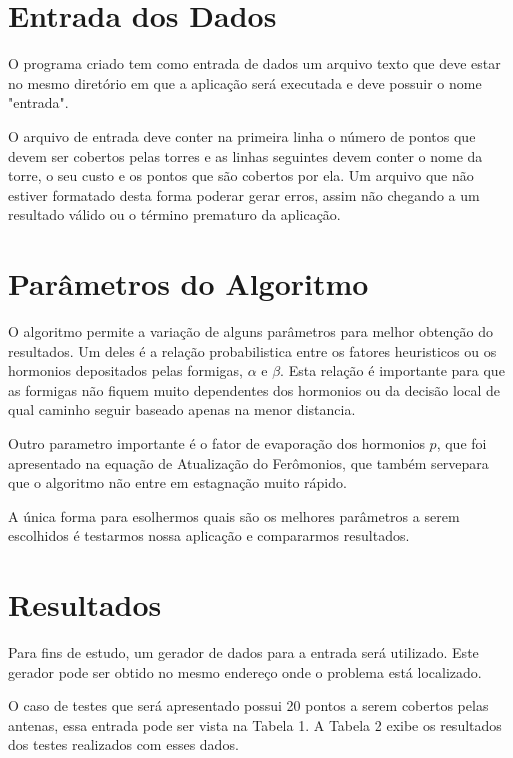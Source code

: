 \documentclass[12pt]{article}
\begin{document}
\section{Entrada dos Dados}

O programa criado tem como entrada de dados um arquivo texto que deve estar no mesmo
diretório em que a aplicação será executada e deve possuir o nome "entrada".

O arquivo de entrada deve conter na primeira linha o número de pontos que devem ser cobertos pelas torres e
as linhas seguintes devem conter o nome da torre, o seu custo e os pontos que
são cobertos por ela. Um arquivo que não estiver formatado desta forma poderar
gerar erros, assim não chegando a um resultado válido ou o término prematuro da
aplicação.

\section{Parâmetros do Algoritmo}

O algoritmo permite a variação de alguns parâmetros para melhor obtenção do resultados.
Um deles é a relação probabilistica entre os fatores heuristicos ou os hormonios depositados
pelas formigas, $\alpha$ e $\beta$. Esta relação é importante para que as formigas não fiquem
muito dependentes dos hormonios ou da decisão local de qual caminho seguir baseado
apenas na menor distancia.

Outro parametro importante é o fator de evaporação dos hormonios $p$, que foi apresentado na 
equação de Atualização do Ferômonios, que também servepara que o algoritmo não entre 
em estagnação muito rápido.

A única forma para esolhermos quais são os melhores parâmetros a serem escolhidos
é testarmos nossa aplicação e compararmos resultados.

\section{Resultados}
Para fins de estudo, um gerador de dados para a entrada será utilizado. Este
gerador pode ser obtido no mesmo endereço onde o problema está localizado.

O caso de testes que será apresentado possui 20 pontos a serem cobertos
pelas antenas, essa entrada pode ser vista na Tabela 1. A Tabela 2 exibe os resultados 
dos testes realizados com esses dados.
\end{document}

